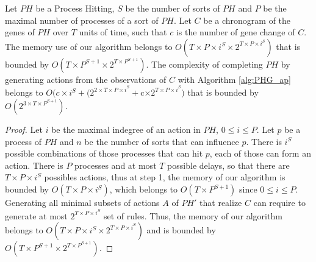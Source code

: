 \begin{theorem}[Complexity]
	\label{th:complexity}
	Let $PH$ be a Process Hitting, $S$ be the number of sorts of $PH$ and $P$ be the maximal number of processes of a sort of $PH$.
	Let $C$ be a chronogram of the genes of $PH$ over $T$ units of time, such that $c$ is the number of gene change of $C$.
	The memory use of our algorithm belongs to $O(T \times  P \times  i^S \times  2^{T\times  P \times  i^S})$ that is bounded by $O(T \times  P^{S+1} \times  2^{T\times  P^{S+1}})$.
	The complexity of completing $PH$ by generating actions from the observations of $C$ with Algorithm \ref{alg:PHG_ap} belongs to
	$O(c\times i^S + (2^{2\times T\times  P \times  i^S} + $c$ \times  2^{T\times  P \times  i^S})$ that is bounded by $O(2^{3\times T\times P^{S+1}})$.
	\begin{proof}
		Let $i$ be the maximal indegree of an action in $PH$, $0 \leq i \leq P$.
		Let $p$ be a process of $PH$ and $n$ be the number of sorts that can influence $p$.
		There is $i^S$ possible combinations of those processes that can hit $p$, each of those can form an action.
		There is $P$ processes and at most $T$ possible delays, so that there are $T\times  P \times  i^S$ possibles actions,
		thus at step 1, the memory of our algorithm is bounded by $O(T \times  P \times  i^S)$,
		which belongs to $O(T\times P^{S+1})$ since $0 \leq i \leq P$.
		Generating all minimal subsets of actions $A$ of $PH'$ that realize $C$ can require to generate at most $2^{T\times  P \times  i^S}$ set of rules.
		Thus, the memory of our algorithm belongs to $O(T \times  P \times  i^S \times  2^{T\times  P \times  i^S})$ and is bounded by $O(T \times  P^{S+1} \times  2^{T\times  P^{S+1}})$.
		

\end{proof}
\end{theorem}
